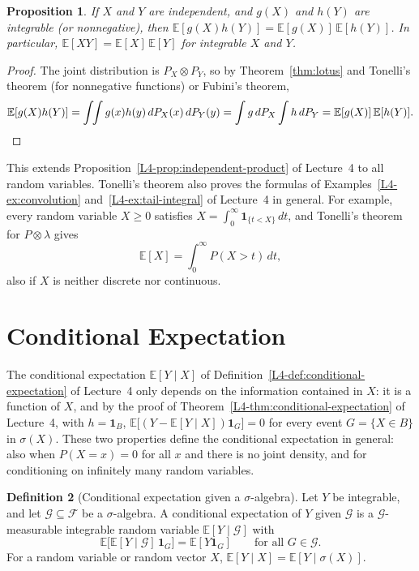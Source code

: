 \documentclass[11pt]{article}
\newcommand{\E}{\mathbb{E}}
\theoremstyle{definition}
\newtheorem{definition}{Definition}[section]
\theoremstyle{plain}
\newtheorem{proposition}[definition]{Proposition}
\theoremstyle{remark}
\begin{document}
\begin{proposition}\label{prop:independent-product}
    If $X$ and $Y$ are independent, and $g(X)$ and $h(Y)$ are integrable (or nonnegative), then $\E[g(X)h(Y)] = \E[g(X)]\,\E[h(Y)]$. In particular, $\E[XY] = \E[X]\,\E[Y]$ for integrable $X$ and $Y$.
\end{proposition}

\begin{proof}
    The joint distribution is $P_X \otimes P_Y$, so by Theorem~\ref{thm:lotus} and Tonelli's theorem (for nonnegative functions) or Fubini's theorem,
    \[\E[g(X)h(Y)] = \int\!\!\int g(x)h(y)\, dP_X(x)\, dP_Y(y) = \int g\, dP_X\int h\, dP_Y = \E[g(X)]\,\E[h(Y)]. \qedhere\]
\end{proof}

This extends Proposition~\ref{L4-prop:independent-product} of Lecture~4 to all random variables. Tonelli's theorem also proves the formulas of Examples~\ref{L4-ex:convolution} and~\ref{L4-ex:tail-integral} of Lecture~4 in general. For example, every random variable $X \geq 0$ satisfies $X = \int_0^\infty \mathbf{1}_{\{t < X\}}\, dt$, and Tonelli's theorem for $P \otimes \lambda$ gives
\[\E[X] = \int_0^\infty P(X > t)\, dt,\]
also if $X$ is neither discrete nor continuous.

\section{Conditional Expectation}\label{sec:conditional-expectation}

The conditional expectation $\E[Y \mid X]$ of Definition~\ref{L4-def:conditional-expectation} of Lecture~4 only depends on the information contained in $X$: it is a function of $X$, and by the proof of Theorem~\ref{L4-thm:conditional-expectation} of Lecture~4, with $h = \mathbf{1}_B$, $\E\big[(Y - \E[Y \mid X])\mathbf{1}_G\big] = 0$ for every event $G = \{X \in B\}$ in $\sigma(X)$. These two properties define the conditional expectation in general: also when $P(X = x) = 0$ for all $x$ and there is no joint density, and for conditioning on infinitely many random variables.

\begin{definition}[Conditional expectation given a $\sigma$-algebra]\label{def:conditional-expectation-general}
    Let $Y$ be integrable, and let $\mathcal{G} \subseteq \mathcal{F}$ be a $\sigma$-algebra. A conditional expectation of $Y$ given $\mathcal{G}$ is a $\mathcal{G}$-measurable integrable random variable $\E[Y \mid \mathcal{G}]$ with
    \[\E\big[\E[Y \mid \mathcal{G}]\,\mathbf{1}_G\big] = \E[Y\mathbf{1}_G] \qquad \text{for all } G \in \mathcal{G}.\]
    For a random variable or random vector $X$, $\E[Y \mid X] = \E[Y \mid \sigma(X)]$.
\end{definition}
\end{document}
